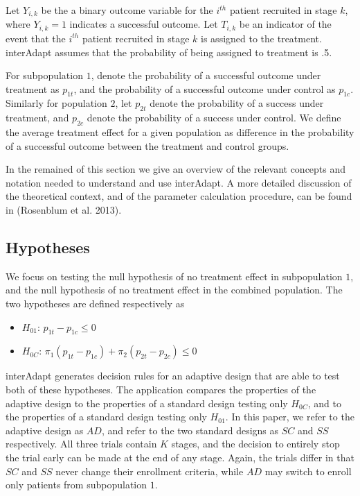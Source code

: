 \documentclass{article}
\newcommand{\interAdapt}{\textsf{interAdapt }}
\begin{document}
Let $Y_{i,k}$ be the a binary outcome variable for the $i^{th}$ patient recruited in stage $k$, where $Y_{i,k}=1$ indicates a successful outcome. Let $T_{i,k}$ be an indicator of the event that the $i^{th}$ patient recruited in stage $k$ is assigned to the treatment. \interAdapt assumes that the probability of being assigned to treatment is .5.

For subpopulation $1$, denote the probability of a successful outcome under treatment as $p_{1t}$, and the probability of a successful outcome under control as $p_{1c}$. Similarly for population $2$, let $p_{2t}$ denote the probability of a success under treatment, and $p_{2c}$ denote the probability of a success under control. We define the average treatment effect for a given population as difference in the probability of a successful outcome between the treatment and control groups.


In the remained of this section we give an overview of the relevant concepts and notation needed to understand and use \textsf{interAdapt}. A more detailed discussion of the theoretical context, and of the parameter calculation procedure, can be found in (Rosenblum et al. 2013)\cite{Rosenblum2013AdaptMISTIE}.
 
\subsection*{Hypotheses}

We focus on testing the null hypothesis of no treatment effect in subpopulation $1$, and the null hypothesis of no treatment effect in the combined population. The two hypotheses are defined respectively as

\begin{itemize}
\item $H_{01}$: $p_{1t}-p_{1c}≤0$%
\item $H_{0C}$: $π_1(p_{1t}-p_{1c}) + π_2(p_{2t}-p_{2c}) ≤ 0$ %
\end{itemize}

\interAdapt generates decision rules for an adaptive design that are able to test both of these hypotheses. The application compares the properties of the adaptive design to the properties of a standard design testing only $H_{0C}$, and to the properties of a standard design testing only $H_{01}$. In this paper, we refer to the adaptive design  as $AD$, and refer to the two standard designs as $SC$ and $SS$ respectively. All three trials contain $K$ stages, and the decision to entirely stop the trial early can be made at the end of any stage. Again, the trials differ in that $SC$ and $SS$ never change their enrollment criteria, while $AD$ may switch to enroll only patients from subpopulation $1$.
\end{document}
